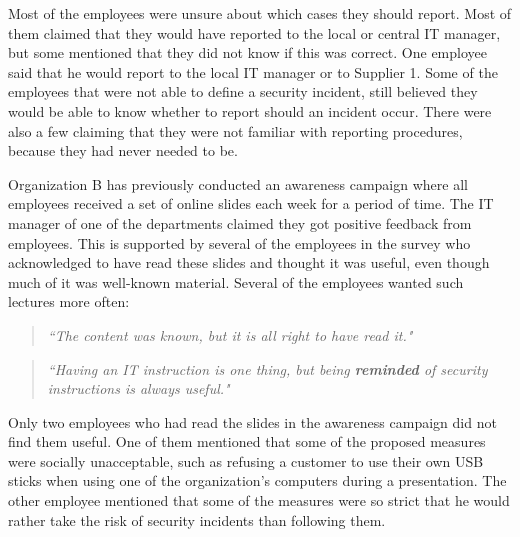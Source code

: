 Most of the employees were unsure about which cases they should report. Most of them claimed that they would have reported to the local or central IT manager, but some mentioned that they did not know if this was correct. One employee said that he would report to the local IT manager or to Supplier 1. Some of the employees that were not able to define a security incident, still believed they would be able to know whether to report should an incident occur. There were also a few claiming that they were not familiar with reporting procedures, because they had never needed to be.

Organization B has previously conducted an awareness campaign where all employees received a set of online slides each week for a period of time. The IT manager of one of the departments claimed they got positive feedback from employees. This is supported by several of the employees in the survey who acknowledged to have read these slides and thought it was useful, even though much of it was well-known material. Several of the employees wanted such lectures more often:

\begin{quote}
\textit{``The content was known, but it is all right to have read it."}
\end{quote} 

\begin{quote}
\textit{``Having an IT instruction is one thing, but being \textbf{reminded} of security instructions is always useful."}
\end{quote}

Only two employees who had read the slides in the awareness campaign did not find them useful. One of them mentioned that some of the proposed measures were socially unacceptable, such as refusing a customer to use their own USB sticks when using one of the organization's computers during a presentation. The other employee mentioned that some of the measures were so strict that he would rather take the risk of security incidents than following them.